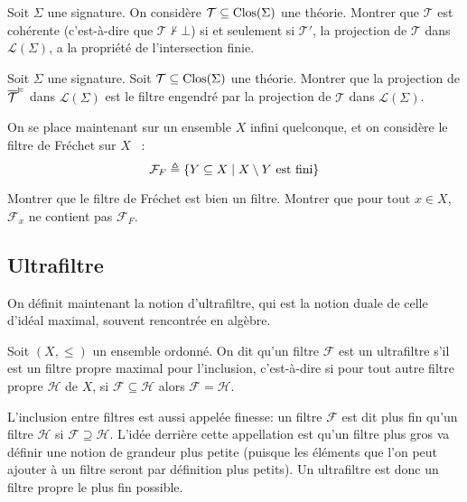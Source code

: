 \begin{exercise}
  Soit $\Sigma$ une signature. On considère $\mathcal T\subseteq\operatorname{Clos}(\Sigma)$
  une théorie. Montrer que $\mathcal T$ est cohérente (c'est-à-dire que
  $\mathcal T\nvdash \bot$) si et seulement si $\mathcal T'$, la projection
  de $\mathcal T$ dans $\mathcal L(\Sigma)$, a la propriété de l'intersection
  finie.
\end{exercise}

\begin{exercise}
  Soit $\Sigma$ une signature. Soit $\mathcal T\subseteq\operatorname{Clos}(\Sigma)$ une
  théorie. Montrer que la projection de $\overline{\mathcal T}^{\vDash}$ dans
  $\mathcal L(\Sigma)$ est le filtre engendré par la projection de $\mathcal T$
  dans $\mathcal L(\Sigma)$.
\end{exercise}

\begin{exercise}
  On se place maintenant sur un ensemble $X$ infini quelconque, et on considère
  le filtre de Fréchet sur $X$~ :
  \[\mathcal F_F \triangleq \{Y\subseteq X \mid X \setminus Y\text{ est fini}\}\]

  Montrer que le filtre de Fréchet est bien un filtre. Montrer que pour tout
  $x \in X$, $\mathcal F_x$ ne contient pas $\mathcal F_F$.
\end{exercise}

\subsection{Ultrafiltre}\label{sbsct.ultrafiltre}

On définit maintenant la notion d'ultrafiltre, qui est la notion duale de celle
d'idéal maximal, souvent rencontrée en algèbre.

\begin{definition}[Ultrafiltre]
  Soit $(X,\leq)$ un ensemble ordonné. On dit qu'un filtre $\mathcal F$ est un
  ultrafiltre s'il est un filtre propre maximal pour l'inclusion, c'est-à-dire
  si pour tout autre filtre propre $\mathcal H$ de $X$, si
  $\mathcal F \subseteq\mathcal H$ alors $\mathcal F = \mathcal H$.
\end{definition}

\begin{remark}
  L'inclusion entre filtres est aussi appelée \og finesse\fg : un filtre
  $\mathcal F$ est dit plus fin qu'un filtre $\mathcal H$ si
  $\mathcal F\supseteq\mathcal H$. L'idée derrière cette appellation est qu'un
  filtre plus gros va définir une notion de grandeur plus petite (puisque les
  éléments que l'on peut ajouter à un filtre seront par définition plus petits).
  Un ultrafiltre est donc un filtre propre le plus fin possible.
\end{remark}

